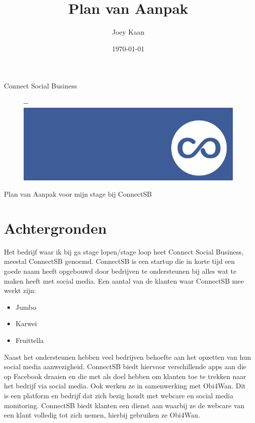 \documentclass{article}
\title{Plan van Aanpak}
\author{Joey Kaan}
\date{\today}
\begin{document}

\begin{center}

{\Huge Connect Social Business\par}
\begin{figure}[!ht]
  \begin{adjustwidth}{-\oddsidemargin-1in}{-\rightmargin}
    \centering
    \includegraphics[width=\paperwidth]{connectsblogo}
  \end{adjustwidth}
\end{figure}

Plan van Aanpak voor mijn stage bij ConnectSB

\end{center}
\thispagestyle{empty}
\clearpage



\maketitle
\thispagestyle{empty}
\clearpage



\tableofcontents
\thispagestyle{empty}
\clearpage



\section{Achtergronden}
Het bedrijf waar ik bij ga stage lopen/stage loop heet Connect Social Business, meestal ConnectSB genoemd. ConnectSB is een startup die in korte tijd een goede naam heeft opgebouwd door bedrijven te ondersteunen bij alles wat te maken heeft met social media. Een aantal van de klanten waar ConnectSB mee werkt zijn:
\begin{itemize}
\item Jumbo
\item Karwei
\item Fruittella
\end{itemize}
Naast het ondersteunen hebben veel bedrijven behoefte aan het opzetten van hun social media aanwezigheid. ConnectSB biedt hiervoor verschillende apps aan die op Facebook draaien en die met als doel hebben om klanten toe te trekken naar het bedrijf via social media. Ook werken ze in samenwerking met Obi4Wan. Dit is een platform en bedrijf dat zich bezig houdt met webcare en social media monitoring. ConnectSB biedt klanten een dienst aan waarbij ze de webcare van een klant volledig tot zich nemen, hierbij gebruiken ze Obi4Wan.
\end{document}
